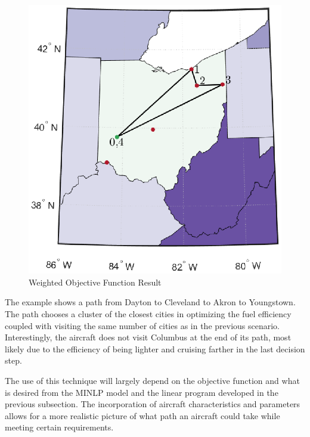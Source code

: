 \begin{figure}[H]
    \centering
    \includegraphics{Thesis/Method_II/fmin3000_negF.eps}
    \caption{Weighted Objective Function Result}
    \label{fig:weightedObj}
\end{figure}
The example shows a path from Dayton to Cleveland to Akron to Youngstown. The path chooses a cluster of the closest cities in optimizing the fuel efficiency coupled with visiting the same number of cities as in the previous scenario. Interestingly, the aircraft does not visit Columbus at the end of its path, most likely due to the efficiency of being lighter and cruising farther in the last decision step.\par
The use of this technique will largely depend on the objective function and what is desired from the MINLP model and the linear program developed in the previous subsection. The incorporation of aircraft characteristics and parameters allows for a more realistic picture of what path an aircraft could take while meeting certain requirements. 


